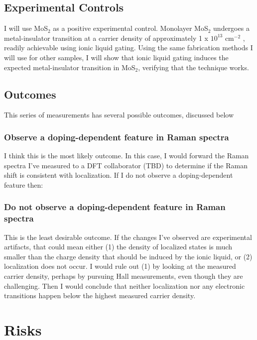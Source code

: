 \documentclass[11pt]{article}
\begin{document}
\subsection{Experimental Controls}

I will use MoS$_{2}$ as a positive experimental control. Monolayer MoS$_{2}$ undergoes a metal-insulator transition at a carrier density of approximately 1 x $10^{13}$ cm$^{-2}$ \cite{Radisavljevic2013}, readily achievable using ionic liquid gating. Using the same fabrication methods I will use for other samples, I will show that ionic liquid gating induces the expected metal-insulator transition in MoS$_{2}$, verifying that the technique works.

\subsection{Outcomes}

This series of measurements has several possible outcomes, discussed below

\subsubsection{Observe a doping-dependent feature in Raman spectra}
I think this is the most likely outcome. In this case, I would forward the Raman spectra I've measured to a DFT collaborator (TBD) to determine if the Raman shift is consistent with localization. If I do not observe a doping-dependent feature then:

\subsubsection{Do not observe a doping-dependent feature in Raman spectra}
This is the least desirable outcome. If the changes I've observed are experimental artifacts, that could mean either (1) the density of localized states is much smaller than the charge density that should be induced by the ionic liquid, or (2) localization does not occur. I would rule out (1) by looking at the measured carrier density, perhaps by pursuing Hall measurements, even though they are challenging. Then I would conclude that neither localization nor any electronic transitions happen below the highest measured carrier density.

\section{Risks}
\end{document}
